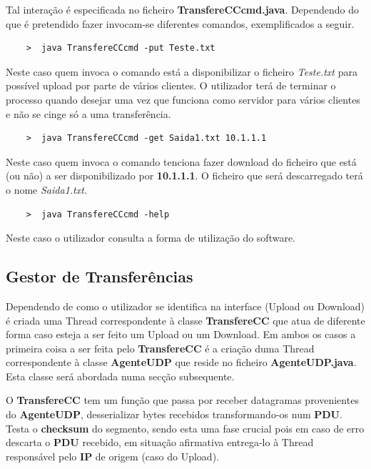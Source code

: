 \documentclass{llncs}
\begin{document}
Tal interação é especificada no ficheiro \textbf{TransfereCCcmd.java}. Dependendo do que é pretendido fazer invocam-se diferentes comandos, exemplificados a seguir.

\begin{verbatim}
	>  java TransfereCCcmd -put Teste.txt
\end{verbatim}

Neste caso quem invoca o comando está a disponibilizar o ficheiro \textit{Teste.txt} para possível upload por parte de vários clientes. O utilizador terá de terminar o processo quando desejar uma vez que funciona como servidor para vários clientes e não se cinge só a uma transferência.

\begin{verbatim}
	>  java TransfereCCcmd -get Saida1.txt 10.1.1.1
\end{verbatim}

Neste caso quem invoca o comando tenciona fazer download do ficheiro que está (ou não) a ser disponibilizado por \textbf{10.1.1.1}. O ficheiro que será descarregado terá o nome \textit{Saida1.txt}.

\begin{verbatim}
	>  java TransfereCCcmd -help
\end{verbatim}

Neste caso o utilizador consulta a forma de utilização do software.


\subsection{Gestor de Transferências}

Dependendo de como o utilizador se identifica na interface (Upload ou Download) é criada uma Thread correspondente à classe \textbf{TransfereCC} que atua de diferente forma caso esteja a ser feito um Upload ou um Download. Em ambos os casos a primeira coisa a ser feita pelo \textbf{TransfereCC} é a criação duma Thread correspondente à classe \textbf{AgenteUDP} que reside no ficheiro \textbf{AgenteUDP.java}. Esta classe será abordada numa secção subsequente.

O \textbf{TransfereCC} tem um função que passa por receber datagramas provenientes do \textbf{AgenteUDP}, desserializar bytes recebidos transformando-os num \textbf{PDU}. Testa o \textbf{checksum} do segmento, sendo esta uma fase crucial pois em caso de erro descarta o \textbf{PDU} recebido, em situação afirmativa entrega-lo à Thread responsável pelo \textbf{IP} de origem (caso do Upload).
\end{document}
